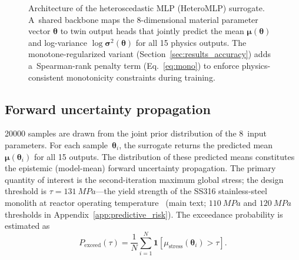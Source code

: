\documentclass[pdflatex,sn-mathphys-num]{sn-jnl}
\theoremstyle{thmstyleone}
\theoremstyle{thmstyletwo}
\theoremstyle{thmstylethree}
\begin{document}
\begin{figure}[ht]
  \centering
  \caption{%
    Architecture of the heteroscedastic MLP (HeteroMLP) surrogate.
    A~shared backbone maps the 8-dimensional material parameter vector
    $\bm{\theta}$ to twin output heads that jointly predict the mean
    $\bm{\mu}(\bm{\theta})$ and log-variance $\log\bm{\sigma}^2(\bm{\theta})$
    for all 15 physics outputs.
    The monotone-regularized variant (Section~\ref{sec:results_accuracy})
    adds a~Spearman-rank penalty term (Eq.~\eqref{eq:mono}) to enforce
    physics-consistent monotonicity constraints during training.
  }\label{fig:architecture}
\end{figure}

\subsection{Forward uncertainty propagation}\label{sec:forward_uq}


\num{20000} samples are drawn from the joint prior distribution of the
8~input parameters.
For each sample~$\bm{\theta}_i$, the surrogate returns the predicted mean
$\bm{\mu}(\bm{\theta}_i)$ for all 15 outputs.
The distribution of these predicted means constitutes the epistemic (model-mean)
forward uncertainty propagation.
The primary quantity of interest is the second-iteration maximum global stress; the
design threshold is $\tau = \SI{131}{MPa}$---the yield strength of the SS316
stainless-steel monolith at reactor operating temperature~\cite{ref:zhang2025energy}
(main text; $\SI{110}{MPa}$ and $\SI{120}{MPa}$ thresholds in
Appendix~\ref{app:predictive_risk}).
The exceedance probability is estimated as
\begin{equation}
  P_{\mathrm{exceed}}(\tau) = \frac{1}{N}\sum_{i=1}^{N}
  \mathbf{1}\!\left[\mu_{\mathrm{stress}}(\bm{\theta}_i) > \tau\right].
  \label{eq:pexceed}
\end{equation}
\end{document}
